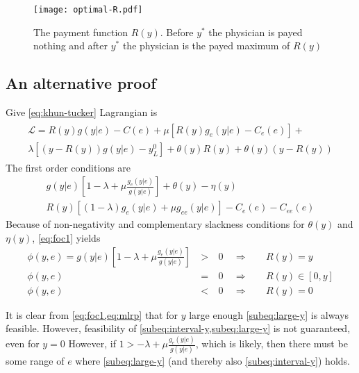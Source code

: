 \begin{figure}[htbp]
    \centering
    \texttt{[image: optimal-R.pdf]}
    \caption{The payment function $R(y)$. Before $y^*$ the physician is payed nothing and after $y^*$ the physician is the payed maximum of $R(y)$ }
    \label{fig:label}
\end{figure}

\subsection{An alternative proof} %
\label{sub:an_alternative_proof}
Give \cref{eq:khun-tucker}  Lagrangian is
\begin{align}
    \begin{split}
        \mathcal{L}=R(y)g(y|e)-C(e)+\mu [R(y)g_e(y|e)-C_e(e)]+ \\ 
        \lambda [(y-R(y))g(y|e)-y_L^0]+\theta(y) R(y)+\theta(y)\left(y-R(y)\right)
    \end{split}
\end{align}
The first order conditions are
\begin{subequations}
\label{eq:foc}
\begin{align}
    g(y|e)\left[1-\lambda+\mu \frac{g_e(y|e)}{g(y|e)}\right]+\theta(y)-\eta(y) \label{eq:foc1} \\
    R(y)\left[(1-\lambda)g_e(y|e)+\mu g_{ee}(y|e)\right]-C_e(e)-C_{ee}(e)
\end{align}
\end{subequations}
Because of non-negativity and complementary slackness conditions for $\theta(y)$ and $\eta(y)$, \cref{eq:foc1} yields
\begin{subequations}
\label{eq:KT-analysis}
\begin{alignat}{3}
\phi(y,e) = g(y|e)\left[1-\lambda+\mu \frac{g_e(y|e)}{g(y|e)}\right]
   & \: > \: & 0 &\enspace \Rightarrow &&\enspace R(y)=y \label{subeq:large-y}\\
 \phi(y,e)   & \: = \: & 0 &\enspace \Rightarrow &&\enspace R(y)\in [0,y] \label{subeq:interval-y} \\
 \phi(y,e)   & \: < \: & 0 &\enspace \Rightarrow &&\enspace R(y) =0 \label{subeq:small-y}
\end{alignat}
\end{subequations}

It is clear from \cref{eq:foc1,eq:mlrp} that for $y$ large enough \cref{subeq:large-y} is always feasible. However, feasibility of \cref{subeq:interval-y,subeq:large-y} is not guaranteed, even for $y=0$ However, if $1>-\lambda+\mu \frac{g_e(y|e)}{g(y|e)}$, which is likely, then there must be some range of $e$ where \cref{subeq:large-y} (and thereby also \cref{subeq:interval-y}) holds. 

